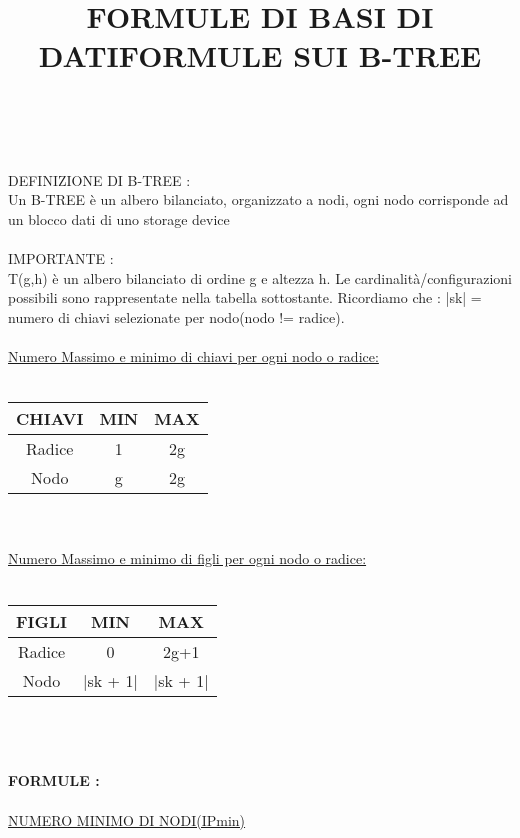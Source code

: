 \documentclass[a4paper,12pt]{article}
\begin{document}
	\large{\title{FORMULE DI BASI DI DATI}}
	\maketitle
	\begin{titlepage}
		\title{{\huge \textbf{FORMULE SUI B-TREE}}}
		\maketitle\\\\
		DEFINIZIONE DI B-TREE :	\\
		Un B-TREE è un albero bilanciato, organizzato a nodi, ogni nodo corrisponde ad un blocco dati di uno storage device \\ \\
		IMPORTANTE : \\
		T(g,h) è un albero bilanciato di ordine g e altezza h. Le cardinalità/configurazioni possibili sono rappresentate nella tabella sottostante.
		Ricordiamo che : |sk| = numero di chiavi selezionate per nodo(nodo != radice). \\ \\
		\underline{Numero Massimo e minimo di chiavi per ogni nodo o radice:} \\ \\ 
		\begin{tabular}{|c|c|c|}
			\hline
			CHIAVI & MIN & MAX \\
			\hline
			Radice & 1 & 2g \\
			\hline
			Nodo & g & 2g\\
			\hline
		\end{tabular} \\ \\
		\underline{Numero Massimo e minimo di figli per ogni nodo o radice:} \\ \\ 
		\begin{tabular}{|c|c|c|}
			\hline
			FIGLI & MIN & MAX \\
			\hline
			Radice & 0 & 2g+1 \\
			\hline
			Nodo & |sk + 1| & |sk + 1|\\
			\hline
		\end{tabular}\\ \\ \\
		\textbf{FORMULE : } \\ \\
			\underline{NUMERO MINIMO DI NODI(IPmin)} \\ \\

\end{titlepage}
\end{document}
